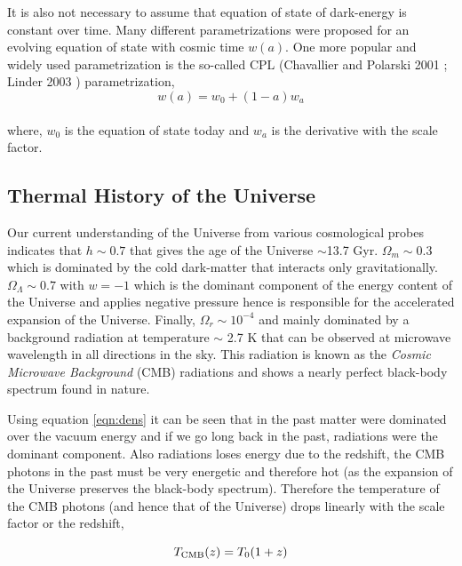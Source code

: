 It is also not necessary to assume that equation of state of dark-energy
is constant over time. Many different parametrizations were proposed
for an evolving equation of state with cosmic time $w(a)$. One more popular
and widely used parametrization is the so-called CPL (Chavallier and Polarski
2001 \cite{2001IJMPD..10..213C}; Linder 2003 \citep{2003PhRvL..90i1301L}) parametrization,
\begin{equation}
	w(a) = w_0 + (1-a)w_a
\end{equation}
\\
where, $w_0$ is the equation of state today and $w_a$ is the derivative with
the scale factor. 

\subsection{Thermal History of the Universe}

Our current understanding of the Universe from various cosmological probes 
indicates that $h \sim 0.7$ that gives the
age of the Universe $\sim$13.7 Gyr.  $\Omega_m \sim 0.3$ which is dominated
by the cold dark-matter that interacts only gravitationally.
$\Omega_{\Lambda} \sim 0.7$ with $w=-1$ 
which is the dominant component of the energy
content of the Universe and applies negative pressure hence is responsible
for the accelerated expansion of the Universe. Finally, $\Omega_r \sim 10^{-4}$
and mainly dominated by a background radiation at temperature $\sim$ 2.7 K that
can be observed at microwave wavelength in all directions in the sky. This radiation is
known as the {\it Cosmic Microwave Background} (CMB) radiations and shows a nearly
perfect black-body spectrum found in nature.

Using equation \ref{eqn:dens}
it can be seen that in the past matter were dominated over the vacuum 
energy and if we go long back in the past, radiations were the dominant 
component. Also  radiations loses energy due 
to the redshift, the CMB photons in the past must be very energetic and
therefore hot (as the expansion of the Universe preserves the black-body 
spectrum). Therefore the temperature of the CMB photons (and hence that 
of the Universe) drops linearly with the scale factor or the redshift,

\begin{equation}
	T_{\rm CMB}(z) = T_0(1+z)
\end{equation}

